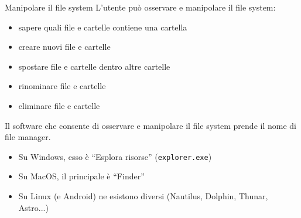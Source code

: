 \documentclass[presentation]{beamer}
\begin{document}
\begin{frame}[fragile]{Manipolare il file system}
  L'utente può osservare e manipolare il file system:
  \begin{itemize}
    \item sapere quali file e cartelle contiene una cartella
    \item creare nuovi file e cartelle
    \item spostare file e cartelle dentro altre cartelle
    \item rinominare file e cartelle
    \item eliminare file e cartelle
  \end{itemize}
  Il software che consente di osservare e manipolare il file system prende il nome di \alert{file manager}.
  \begin{itemize}
    \item Su Windows, esso è ``Esplora risorse'' (\texttt{explorer.exe})
    \item Su MacOS, il principale è ``Finder''
    \item Su Linux (e Android) ne esistono diversi (Nautilus, Dolphin, Thunar, Astro...)
  \end{itemize}
\end{frame}
\end{document}
